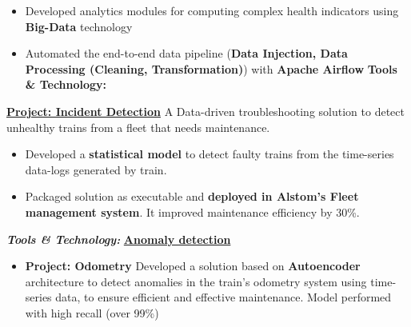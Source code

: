\documentclass[letterpaper]{DS_class_file} %
\begin{document}
\begin{twenty}
{\begin{itemize}
                \item Developed analytics modules for computing complex health indicators using \textbf{Big-Data} technology
                \item Automated the end-to-end data pipeline (\textbf{Data Injection, Data Processing (Cleaning, Transformation)}) with \textbf{Apache Airflow}
        \newline \textbf{Tools \& Technology:}\textit{         }
        \end{itemize}
        \vspace{0.3cm}
        \underline{\textbf{Project: Incident Detection}}
        A Data-driven troubleshooting solution to detect unhealthy trains from a fleet that needs maintenance. 
        \begin{itemize}
            \item Developed a \textbf{statistical model} to detect faulty trains from the time-series data-logs generated by train. 
            \item Packaged solution as executable and \textbf{deployed in Alstom's Fleet management system}. It improved maintenance efficiency by 30\%.
        \end{itemize}
        \textit{\textbf{Tools \& Technology:}    }
        \vspace{0.3cm}
        \underline{\textbf{Anomaly detection}}
        \begin{itemize}
            \item \textbf{Project: Odometry} Developed a solution based on \textbf{Autoencoder} architecture to detect anomalies in the train's odometry system using time-series data, to ensure efficient and effective maintenance. Model performed with high recall (over 99\%)

\end{itemize}}
\end{twenty}
\end{document}
